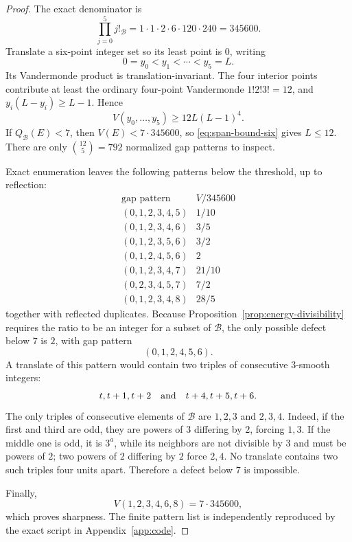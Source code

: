 \documentclass[11pt,oneside]{article}
\theoremstyle{definition}
\theoremstyle{remark}
\newcommand{\B}{\mathcal B}
\begin{document}
\begin{proof}
The exact denominator is
\[
 \prod_{j=0}^{5}j!_{\B}
 =1\cdot1\cdot2\cdot6\cdot120\cdot240
 =345600.
 \label{eq:six-denominator}
\]
Translate a six-point integer set so its least point is \(0\), writing
\[
 0=y_0<y_1<\cdots<y_5=L.
\]
Its Vandermonde product is translation-invariant.  The four interior points contribute at
least the ordinary four-point Vandermonde \(1!2!3!=12\), and
\(y_i(L-y_i)\ge L-1\).  Hence
\begin{equation}
 V(y_0,\ldots,y_5)
 \ge 12L(L-1)^4.
 \label{eq:span-bound-six}
\end{equation}
If \(Q_{\B}(E)<7\), then \(V(E)<7\cdot345600\), so \eqref{eq:span-bound-six} gives
\(L\le12\).  There are only \(\binom{12}{5}=792\) normalized gap patterns to inspect.

Exact enumeration leaves the following patterns below the threshold, up to reflection:
\[
\begin{array}{c|c}
\text{gap pattern}&V/345600\\ \hline
(0,1,2,3,4,5)&1/10\\
(0,1,2,3,4,6)&3/5\\
(0,1,2,3,5,6)&3/2\\
(0,1,2,4,5,6)&2\\
(0,1,2,3,4,7)&21/10\\
(0,2,3,4,5,7)&7/2\\
(0,1,2,3,4,8)&28/5
\end{array}
\]
together with reflected duplicates.  Because Proposition~\ref{prop:energy-divisibility}
requires the ratio to be an integer for a subset of \(\B\), the only possible defect below
\(7\) is \(2\), with gap pattern
\[
  (0,1,2,4,5,6).
\]
A translate of this pattern would contain two triples of consecutive \(3\)-smooth integers:
\[
 t,t+1,t+2
 \quad\hbox{and}\quad
 t+4,t+5,t+6.
\]
The only triples of consecutive elements of \(\B\) are \(1,2,3\) and \(2,3,4\).  Indeed, if
the first and third are odd, they are powers of \(3\) differing by \(2\), forcing \(1,3\).
If the middle one is odd, it is \(3^a\), while its neighbors are not divisible by \(3\) and
must be powers of \(2\); two powers of \(2\) differing by \(2\) force \(2,4\).  No translate
contains two such triples four units apart.  Therefore a defect below \(7\) is impossible.

Finally,
\[
 V(1,2,3,4,6,8)=7\cdot345600,
\]
which proves sharpness.  The finite pattern list is independently reproduced by the exact
script in Appendix~\ref{app:code}.
\end{proof}
\end{document}
